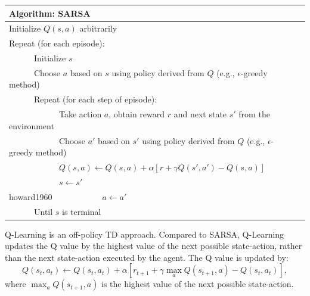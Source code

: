 \begin{center}
\begin{tabular}{@{}lp{6cm}@{}}
\hline
Algorithm: SARSA\\
\hline
Initialize $Q(s, a)$ arbitrarily\\
Repeat (for each episode):\\
\ \ \ \ \ \ Initialize $s$\\
\ \ \ \ \ \ Choose $a$ based on $s$ using policy derived from $Q$ (e.g., $\epsilon$-greedy method)\\
\ \ \ \ \ \ Repeat (for each step of episode):\\
\ \ \ \ \ \ \ \ \ \ \ \ Take action $a$, obtain reward $r$ and next state $s'$ from the environment\\
\ \ \ \ \ \ \ \ \ \ \ \ Choose $a'$ based on $s'$ using policy derived from $Q$ (e.g., $\epsilon$-greedy method)\\
\ \ \ \ \ \ \ \ \ \ \ \ $Q(s, a) \leftarrow Q(s, a) + \alpha [r + \gamma Q(s', a')-Q(s, a)]$\\
\ \ \ \ \ \ \ \ \ \ \ \ $s \leftarrow s'$\\
howard1960\ \ \ \ \ \ \ \ \ \ \ \ $a \leftarrow a'$\\
\ \ \ \ \ \ Until $s$ is terminal\\
\hline  
\end{tabular}
\end{center}


Q-Learning is an off-policy TD approach. Compared to SARSA, Q-Learning updates
the Q value by the highest value of the next possible state-action, rather than the 
next state-action executed by the agent.  
The Q value is updated by:
\begin{displaymath}
   Q(s_t, a_t) \leftarrow Q(s_t, a_t) + \alpha [r_{t+1}+\gamma \max_a Q(s_{t+1},a)-Q(s_t,a_t)],
\end{displaymath}
where $\max_a Q(s_{t+1},a)$ is the highest value of the next possible state-action. 

